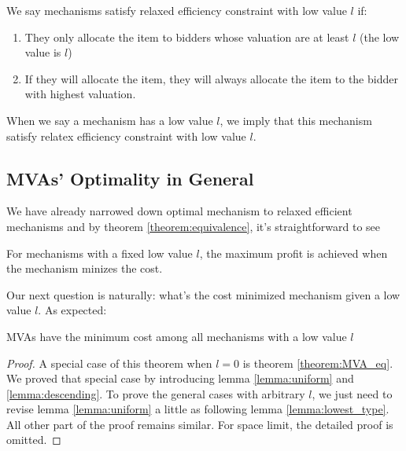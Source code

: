 \begin{definition}

We say mechanisms satisfy relaxed efficiency constraint with low value $l$
if:

    \begin{enumerate}

    \item They only allocate the item to bidders whose valuation are at least
    $l$ (the low value is $l$)

    \item If they will allocate the item, they will always allocate the item to
    the bidder with highest valuation.

    \end{enumerate}

When we say a mechanism has a low value $l$, we imply that this mechanism
satisfy relatex efficiency constraint with low value $l$.

\end{definition}

\subsection{MVAs' Optimality in General}

We have already narrowed down optimal mechanism to
relaxed efficient mechanisms and by theorem \ref{theorem:equivalence},
it's straightforward to see

\begin{corollary}

For mechanisms with a fixed low value $l$, the maximum profit is
achieved when the mechanism minizes the cost.

\end{corollary}

Our next question is naturally: what's the cost minimized mechanism
given a low value $l$. As expected:

\begin{theorem}

MVAs have the minimum cost among all mechanisms with a low value $l$

\end{theorem}

\begin{proof}
A special case of this theorem when $l = 0$ is theorem \ref{theorem:MVA_eq}.
We proved that special case by introducing lemma \ref{lemma:uniform} and
\ref{lemma:descending}. To prove the general cases with arbitrary $l$, we just
need to revise lemma \ref{lemma:uniform} a little as following lemma
\ref{lemma:lowest_type}. All other part of the proof remains similar. For space
limit, the detailed proof is omitted.
\end{proof}

